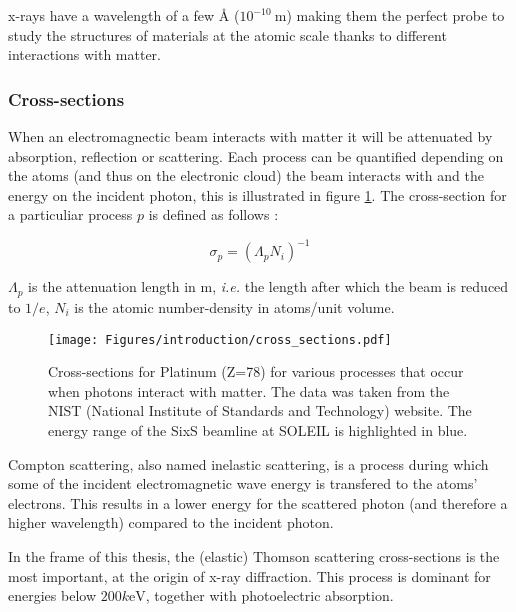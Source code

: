 x-rays have a wavelength of a few \si{\angstrom} ($10^{-10} \:\si{\meter}$) making them the perfect probe to study the structures of materials at the atomic scale thanks to different interactions with matter.

\subsubsection{Cross-sections}

When an electromagnectic beam interacts with matter it will be attenuated by absorption, reflection or scattering.
Each process can be quantified depending on the atoms (and thus on the electronic cloud) the beam interacts with and the energy on the incident photon, this is illustrated in figure \ref{fig:cross_sections}.
The cross-section for a particuliar process $p$ is defined as follows \parencite{Willmott}:

\begin{equation}
	\sigma_p = (\Lambda_p N_i)^{-1}
\end{equation}

$\Lambda_p$ is the attenuation length in \si{\meter}, \textit{i.e.} the length after which the beam is reduced to $1/e$, $N_i$ is the atomic number-density in atoms/unit volume.

\begin{figure}[!htb]
    \centering
    \texttt{[image: Figures/introduction/cross\_sections.pdf]}
    \caption{Cross-sections for Platinum (Z=78) for various processes that occur when photons interact with matter. The data was taken from the NIST (National Institute of Standards and Technology) \parencite{NIST_cross_sections} website. The energy range of the SixS beamline at SOLEIL is highlighted in blue.}
    \label{fig:cross_sections}
\end{figure}

Compton scattering, also named inelastic scattering, is a process during which some of the incident electromagnetic wave energy is transfered to the atoms' electrons.
This results in a lower energy for the scattered photon (and therefore a higher wavelength) compared to the incident photon.

In the frame of this thesis, the (elastic) Thomson scattering cross-sections is the most important, at the origin of x-ray diffraction.
This process is dominant for energies below $200 \si{k\electronvolt}$, together with photoelectric absorption.%

